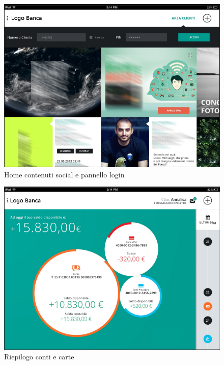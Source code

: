 \begin{figure}[!htbp]
\centering
\includegraphics[scale=0.7]{immagini_mockup/home.png}
\caption{Home contenuti social e pannello login}
\end{figure}

\begin{figure}[!htbp]
\centering
\includegraphics[scale=0.7]{immagini_mockup/bolle.png}
\caption{Riepilogo conti e carte}
\end{figure}

